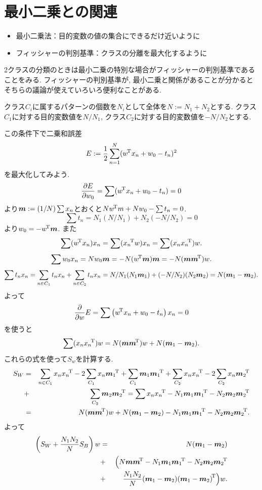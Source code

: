 \section{最小二乗との関連}
\begin{itemize}
\item 最小二乗法：目的変数の値の集合にできるだけ近いように
\item フィッシャーの判別基準：クラスの分離を最大化するように
\end{itemize}
2クラスの分類のときは最小二乗の特別な場合がフィッシャーの判別基準であることをみる.
フィッシャーの判別基準が, 最小二乗と関係があることが分かるとそちらの議論が使えていろいろ便利なことがある.

クラス$C_i$に属するパターンの個数を$N_i$として全体を$N:=N_1+N_2$とする.
クラス$C_1$に対する目的変数値を$N/N_1$, クラス$C_2$に対する目的変数値を$-N/N_2$とする.

この条件下で二乗和誤差
$$E:=\half\sum_{n=1}^N(\trans{w}x_n+w_0-t_n)^2$$
を最大化してみよう.
$$
\diff{w_0}{E}=\sum(\trans{w}x_n+w_0-t_n)=0
$$
より$\bmm:=(1/N)\sum x_n$とおくと$N \trans{w}m+N w_0 - \sum t_n=0$.
$$\sum t_n=N_1(N/N_1) + N_2(-N/N_2)=0$$
より$w_0=-\trans{w}\bmm$. また
$$
\sum(\trans{w}x_n)x_n=\sum(\trans{x_n}w)x_n=\sum(x_n \trans{x_n})w.
$$
$$
\sum w_0 x_n = N w_0 \bmm = -N(\trans{w}\bmm)\bmm=-N(\bmm \trans{\bmm})w.
$$
$$
\sum t_n x_n = \sum_{n\in C_1} t_n x_n + \sum_{n\in C_2} t_n x_n
= N/N_1(N_1 \bmm_1)+(-N/N_2)(N_2 \bmm_2)=N(\bmm_1-\bmm_2).
$$
よって
$$
\dif{w}E=\sum\left(\trans{w}x_n + w_0-t_n\right)x_n=0
$$
を使うと
$$
\sum(x_n \trans{x_n})w=N(\bmm \trans{\bmm})w+N(\bmm_1-\bmm_2).
$$
これらの式を使って$S_w$を計算する.
\begin{eqnarray*}
S_W
 &=& \sum_{n\in C_1} x_n\trans{x_n}-2\sum_{C_1} x_n \trans{\bmm_1}+\sum_{C_1} \bmm_1\trans{\bmm_1} + \sum_{C_2} x_n\trans{x_n} - 2\sum_{C_2} x_n\trans{\bmm_2}\\
 &+& \sum_{C_2} \bmm_2 \trans{\bmm_2}
 = \sum x_n\trans{x_n}-N_1 \bmm_1 \trans{\bmm_1}-N_2 \bmm_2\trans{\bmm_2}\\
 &=&N(\bmm \trans{\bmm})w+N(\bmm_1-\bmm_2)-N_1 \bmm_1 \trans{\bmm_1}-N_2 \bmm_2\trans{\bmm_2}.
\end{eqnarray*}
よって
\begin{eqnarray*}
\left(S_W+\frac{N_1 N_2}{N}S_B\right)w&=&N(\bmm_1-\bmm_2)\\
                           &+&\Bigl(N\bmm \trans{\bmm}-N_1\bmm_1 \trans{\bmm_1}-N_2 \bmm_2 \trans{\bmm_2}\\
                     &+&\frac{N_1 N_2}{N} (\bmm_1 -\bmm_2)\trans{(\bmm_1-\bmm_2)}\Bigr)w.
\end{eqnarray*}

